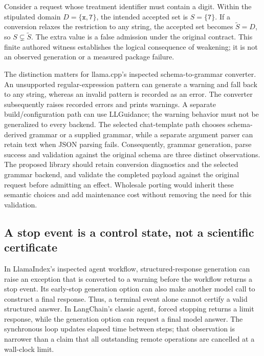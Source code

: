 Consider a request whose treatment identifier must contain a digit. Within the stipulated domain
\(D=\{\texttt{x},\texttt{7}\}\), the intended accepted set is
\(S=\{\texttt{7}\}\). If a conversion relaxes the restriction to any string, the accepted set becomes
\(\widetilde S=D\), so \(S\subsetneq\widetilde S\). The extra value is a false admission under the
original contract. This finite authored witness establishes the logical consequence of weakening;
it is not an observed generation or a measured package failure.\citep{exec28_dl_reference}

The distinction matters for llama.cpp's inspected schema-to-grammar converter. An unsupported
regular-expression pattern can generate a warning and fall back to any string, whereas an invalid
pattern is recorded as an error. The converter subsequently raises recorded errors and prints
warnings. A separate build/configuration path can use LLGuidance; the warning behavior must not be
generalized to every backend. The selected chat-template path chooses schema-derived grammar or a
supplied grammar, while a separate argument parser can retain text when JSON parsing fails.
Consequently, grammar generation, parse success and validation against the original schema are
three distinct observations. The proposed library should retain conversion diagnostics and the
selected grammar backend, and validate the completed payload against the original request before
admitting an effect. Wholesale porting would inherit these semantic choices and add maintenance
cost without removing the need for this validation.\citep{exec28_dl_llamacpp}

\subsection{A stop event is a control state, not a scientific certificate}
In LlamaIndex's inspected agent workflow, structured-response generation can raise an exception
that is converted to a warning before the workflow returns a stop event. Its early-stop generation
option can also make another model call to construct a final response. Thus, a terminal event alone
cannot certify a valid structured answer. In LangChain's classic agent, forced stopping returns a
limit response, while the generation option can request a final model answer. The synchronous loop
updates elapsed time between steps; that observation is narrower than a claim that all outstanding
remote operations are cancelled at a wall-clock limit.\citep{exec28_dl_llama_index,exec28_dl_langchain}

